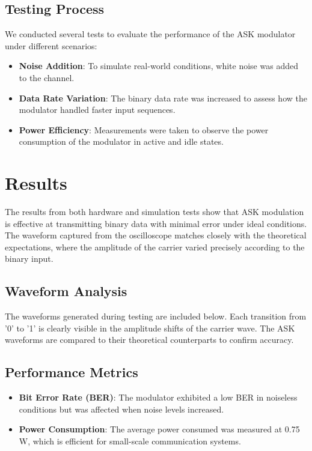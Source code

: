 \documentclass[12pt,a4paper]{article}
\begin{document}
\subsection*{Testing Process}
We conducted several tests to evaluate the performance of the ASK modulator under different scenarios:
\begin{itemize}
    \item \textbf{Noise Addition}: To simulate real-world conditions, white noise was added to the channel.
    \item \textbf{Data Rate Variation}: The binary data rate was increased to assess how the modulator handled faster input sequences.
    \item \textbf{Power Efficiency}: Measurements were taken to observe the power consumption of the modulator in active and idle states.
\end{itemize}

\section*{Results}
The results from both hardware and simulation tests show that ASK modulation is effective at transmitting binary data with minimal error under ideal conditions. The waveform captured from the oscilloscope matches closely with the theoretical expectations, where the amplitude of the carrier varied precisely according to the binary input.

\subsection*{Waveform Analysis}
The waveforms generated during testing are included below. Each transition from '0' to '1' is clearly visible in the amplitude shifts of the carrier wave. The ASK waveforms are compared to their theoretical counterparts to confirm accuracy.

\subsection*{Performance Metrics}
\begin{itemize}
    \item \textbf{Bit Error Rate (BER)}: The modulator exhibited a low BER in noiseless conditions but was affected when noise levels increased.
    \item \textbf{Power Consumption}: The average power consumed was measured at 0.75 W, which is efficient for small-scale communication systems.
\end{itemize}
\end{document}
